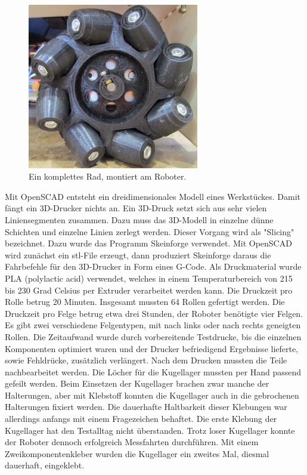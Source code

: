 \documentclass[a4paper,bibtotoc,oneside]{scrbook}
\begin{document}
\begin{figure}[htbp]
\centering
\includegraphics[width=75mm]{img/rad.jpg}
\caption{Ein komplettes Rad, montiert am Roboter.}\label{rad2}
\end{figure}


Mit OpenSCAD entsteht ein dreidimensionales Modell eines Werkstückes. Damit fängt ein 3D-Drucker nichts an. Ein 3D-Druck setzt sich aus sehr vielen Liniensegmenten zusammen. Dazu muss das 3D-Modell in einzelne dünne Schichten und einzelne Linien zerlegt werden. Dieser Vorgang wird als "Slicing" bezeichnet. Dazu wurde das Programm Skeinforge verwendet. Mit OpenSCAD wird zunächst ein stl-File erzeugt, dann produziert Skeinforge daraus die Fahrbefehle für den 3D-Drucker in Form eines G-Code. Als Druckmaterial wurde PLA (polylactic acid) verwendet, welches in einem Temperaturbereich von 215 bis 230 Grad Celsius per Extruder verarbeitet werden kann.    
Die Druckzeit pro Rolle betrug 20 Minuten. Insgesamt mussten 64 Rollen gefertigt werden. Die Druckzeit pro Felge betrug etwa drei Stunden, der Roboter benötigte vier Felgen. Es gibt zwei verschiedene Felgentypen, mit nach links oder nach rechts geneigten Rollen. 
Die Zeitaufwand wurde durch vorbereitende Testdrucke, bis die einzelnen Komponenten optimiert waren und der Drucker befriedigend Ergebnisse lieferte, sowie Fehldrücke, zusätzlich verlängert. 
Nach dem Drucken mussten die Teile nachbearbeitet werden. Die Löcher für die Kugellager mussten per Hand passend gefeilt werden. Beim  Einsetzen der Kugellager brachen zwar manche der Halterungen, aber mit Klebstoff konnten die Kugellager auch in die gebrochenen Halterungen fixiert werden. Die dauerhafte Haltbarkeit dieser Klebungen war allerdings anfangs mit einem Fragezeichen behaftet. Die erste Klebung der Kugellager hat den Testalltag nicht überstanden. Trotz loser Kugellager konnte der Roboter dennoch erfolgreich Messfahrten durchführen. Mit einem Zweikomponentenkleber wurden die Kugellager ein zweites Mal, diesmal dauerhaft, eingeklebt.
\end{document}
